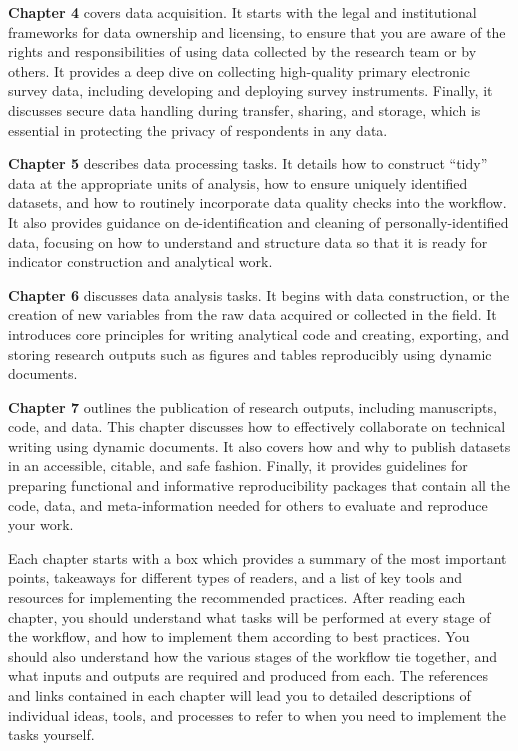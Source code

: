 \textbf{Chapter 4} covers data acquisition. It starts with
the legal and institutional frameworks for data ownership and licensing,
to ensure that you are aware of the rights and responsibilities
of using data collected by the research team or by others.
It provides a deep dive on collecting high-quality primary electronic survey data,
including developing and deploying survey instruments.
Finally, it discusses secure data handling during transfer, sharing, and storage,
which is essential in protecting the privacy of respondents in any data.

\textbf{Chapter 5} describes data processing tasks.
It details how to construct ``tidy'' data at the appropriate units of analysis,
how to ensure uniquely identified datasets, and
how to routinely incorporate data quality checks into the workflow.
It also provides guidance on de-identification and cleaning of personally-identified data,
focusing on how to understand and structure data
so that it is ready for indicator construction and analytical work.

\textbf{Chapter 6} discusses data analysis tasks.
It begins with data construction, or the creation of new variables
from the raw data acquired or collected in the field.
It introduces core principles for writing analytical code
and creating, exporting, and storing research outputs
such as figures and tables reproducibly using dynamic documents.

\textbf{Chapter 7} outlines the publication of research outputs,
including manuscripts, code, and data.
This chapter discusses
how to effectively collaborate on technical writing
using dynamic documents.
It also covers how and why to publish datasets
in an accessible, citable, and safe fashion.
Finally, it provides guidelines for preparing
functional and informative reproducibility packages
that contain all the code, data, and meta-information needed
for others to evaluate and reproduce your work.

Each chapter starts with a box which provides a summary of the most important points,
takeaways for different types of readers, 
and a list of key tools and resources for implementing the recommended practices.
After reading each chapter, you should understand
what tasks will be performed at every stage of the workflow,
and how to implement them according to best practices.
You should also understand how the various stages of the workflow tie together,
and what inputs and outputs are required and produced from each.
The references and links contained in each chapter
will lead you to detailed descriptions of individual
ideas, tools, and processes to refer to when you need to implement the tasks yourself.

